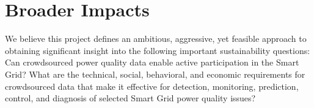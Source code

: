 
\section{Broader Impacts}
\label{sec:merit}




We believe this project defines an ambitious, aggressive, yet feasible approach to obtaining significant insight into the following important sustainability questions: Can crowdsourced power quality data enable active participation in the Smart Grid?  What are the technical, social, behavioral, and economic requirements for crowdsourced data that make it effective for detection, monitoring, prediction, control, and diagnosis of selected Smart Grid power quality issues? 

